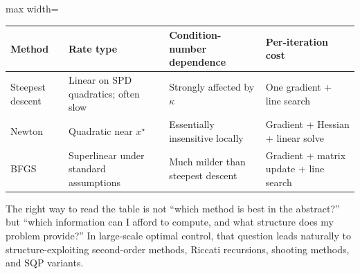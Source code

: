 \begin{center}
	\renewcommand{\arraystretch}{1.35}
	\small
	\begin{adjustbox}{max width=\textwidth}
	\begin{tabular}{p{}p{}p{}p{}}
		\toprule
		Method            & Rate type                           & Condition-number dependence         & Per-iteration cost \\
		\midrule
		Steepest descent  & Linear on SPD quadratics; often slow & Strongly affected by $\kappa$       & One gradient + line search \\
		Newton            & Quadratic near $x^\star$            & Essentially insensitive locally     & Gradient + Hessian + linear solve \\
		BFGS              & Superlinear under standard assumptions & Much milder than steepest descent & Gradient + matrix update + line search \\
		\bottomrule
	\end{tabular}
	\end{adjustbox}
\end{center}

\begin{remark}
	The right way to read the table is not ``which method is best in the abstract?'' but ``which information can I afford to compute, and what structure does my problem provide?'' In large-scale optimal control, that question leads naturally to structure-exploiting second-order methods, Riccati recursions, shooting methods, and SQP variants.
\end{remark}
